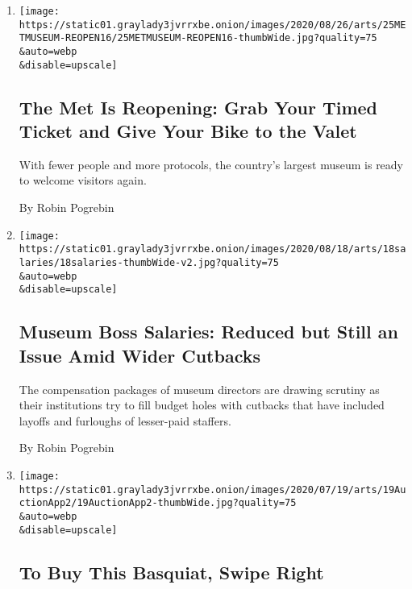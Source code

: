 \begin{enumerate}
\def\labelenumi{\arabic{enumi}.}
\item
  \href{/2020/08/25/arts/design/met-museum-reopening.html}{}

  \texttt{[image: https://static01.graylady3jvrrxbe.onion/images/2020/08/26/arts/25METMUSEUM-REOPEN16/25METMUSEUM-REOPEN16-thumbWide.jpg?quality=75\\\&auto=webp\\\&disable=upscale]}

  \hypertarget{the-met-is-reopening-grab-your-timed-ticket-and-give-your-bike-to-the-valet}{%
  \subsection{The Met Is Reopening: Grab Your Timed Ticket and Give Your
  Bike to the
  Valet}\label{the-met-is-reopening-grab-your-timed-ticket-and-give-your-bike-to-the-valet}}

  With fewer people and more protocols, the country's largest museum is
  ready to welcome visitors again.

  By Robin Pogrebin
\item
  \href{/2020/08/18/arts/design/museum-leader-salaries-pay-disparity.html}{}

  \texttt{[image: https://static01.graylady3jvrrxbe.onion/images/2020/08/18/arts/18salaries/18salaries-thumbWide-v2.jpg?quality=75\\\&auto=webp\\\&disable=upscale]}

  \hypertarget{museum-boss-salaries-reduced-but-still-an-issue-amid-wider-cutbacks}{%
  \subsection{Museum Boss Salaries: Reduced but Still an Issue Amid
  Wider
  Cutbacks}\label{museum-boss-salaries-reduced-but-still-an-issue-amid-wider-cutbacks}}

  The compensation packages of museum directors are drawing scrutiny as
  their institutions try to fill budget holes with cutbacks that have
  included layoffs and furloughs of lesser-paid staffers.

  By Robin Pogrebin
\item
  \href{/2020/07/19/arts/design/swipe-right-buy-basquiat.html}{}

  \texttt{[image: https://static01.graylady3jvrrxbe.onion/images/2020/07/19/arts/19AuctionApp2/19AuctionApp2-thumbWide.jpg?quality=75\\\&auto=webp\\\&disable=upscale]}

  \hypertarget{to-buy-this-basquiat-swipe-right}{%
  \subsection{To Buy This Basquiat, Swipe
  Right}\label{to-buy-this-basquiat-swipe-right}}


\end{enumerate}
